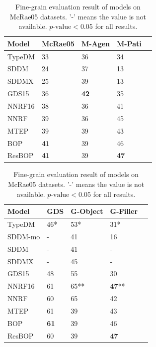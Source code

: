 \documentclass[a4paper]{article}
\begin{document}
\begin{table}[t]
\centering
\begin{tabular}{lllll}
\textbf{Model}  &   McRae05 &   M-Agen   &   M-Pati \\ \hline
TypeDM      &   33      & 36    &   34          \\
SDDM      &   24      &   37      &   13          \\
SDDMX       &   25      &   39      &   13          \\
GDS15       &   36      &\textbf{42}&   35          \\  \hline
NNRF16      &   38      &   36      & 41        \\
NNRF        &   39      &   36      &   45          \\
MTEP        &   39      &   39      &   43          \\
BOP         &\textbf{41}&   39      &   46          \\
ResBOP      &\textbf{41}&   39      & \textbf{47}   \\
\end{tabular}
\caption{\label{tab:eval-thematic-mcrae05} Fine-grain evaluation result of models on McRae05 datasets. '-' means the value is not available. $p\text{-value} < 0.05$ for all results. }
\end{table}


\begin{table}[t]
\centering
\begin{tabular}{lllll}
\textbf{Model}  &   GDS &   G-Object   &   G-Filler \\ \hline
TypeDM      &   46*     & 53*   &   31*         \\
SDDM-mo     &   -       &   41      &   16          \\
SDDM      &   -       &   41      &   -           \\
SDDMX       &   -       &   45      &   -           \\
GDS15       &   48      & 55    &   30          \\  \hline
NNRF16      &   61      &   65**    & \textbf{47}** \\
NNRF        &   60      &   65      &   42      \\
MTEP        &   61      &   39      &   43          \\
BOP         &\textbf{61}&   39      &   46          \\
ResBOP      & 60    &   39      & \textbf{47}   \\
\end{tabular}
\caption{\label{tab:eval-thematic-mcrae05} Fine-grain evaluation result of models on McRae05 datasets. '-' means the value is not available. $p\text{-value} < 0.05$ for all results. }
\end{table}
\end{document}
